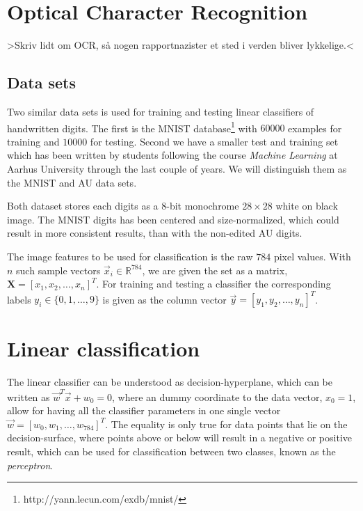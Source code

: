 \documentclass[a4paper,10pt,article,oneside,english]{memoir}
\begin{document}
	
\mainmatter
\chapter{Optical Character Recognition}
>Skriv lidt om OCR, så nogen rapportnazister et sted i verden bliver lykkelige.<

\section{Data sets}
Two similar data sets is used for training and testing linear classifiers of handwritten digits. The first is the MNIST database\footnote{http://yann.lecun.com/exdb/mnist/} with $60000$ examples for training and $10000$ for testing. Second we have a smaller test and training set which has been written by students following the course \emph{Machine Learning} at Aarhus University through the last couple of years. We will distinguish them as the MNIST and AU data sets.


Both dataset stores each digits as a 8-bit monochrome $28\times28$ white on black image. The MNIST digits has been centered and size-normalized, which could result in more consistent results, than with the non-edited AU digits. 

The image features to be used for classification is the raw $784$ pixel values. With $n$ such sample vectors $\vec{x}_i\in \mathbb{R}^{784}$, we are given the set as a matrix, $\mathbf{X} = [x_1, x_2, \dots, x_n]^T$. For training and testing a classifier the corresponding labels $y_i \in \{0,1,\dots,9\}$ is given as the column vector $\vec{y} = [y_1, y_2, \dots, y_n]^T$. 


\chapter{Linear classification}
The linear classifier can be understood as decision-hyperplane, which can be written as $\vec{w}^T \vec{x} + w_0= 0$, where an dummy coordinate to the data vector, $x_0=1$, allow for having all the classifier parameters in one single vector $\vec{w} = [w_0, w_1, \dots, w_{784}]^T$. The equality is only true for data points that lie on the decision-surface, where points above or below will result in a negative or positive result, which can be used for classification between two classes, known as the \emph{perceptron}. 
\end{document}
